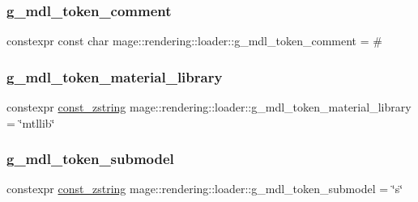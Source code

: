 \hypertarget{namespacemage_1_1rendering_1_1loader_accd79e03f94cc56cddd761a16d7d054e}{}\label{namespacemage_1_1rendering_1_1loader_accd79e03f94cc56cddd761a16d7d054e} 
\subsubsection{\texorpdfstring{g\+\_\+mdl\+\_\+token\+\_\+comment}{g\_mdl\_token\_comment}}
{\footnotesize\ttfamily constexpr const char mage\+::rendering\+::loader\+::g\+\_\+mdl\+\_\+token\+\_\+comment = \textquotesingle{}\#\textquotesingle{}}

\hypertarget{namespacemage_1_1rendering_1_1loader_ae399195268d14aceb61ebf3c020d0690}{}\label{namespacemage_1_1rendering_1_1loader_ae399195268d14aceb61ebf3c020d0690} 
\subsubsection{\texorpdfstring{g\+\_\+mdl\+\_\+token\+\_\+material\+\_\+library}{g\_mdl\_token\_material\_library}}
{\footnotesize\ttfamily constexpr \hyperlink{namespacemage_abfd9206dc607ceb5d13ec68bf075a5c0}{const\+\_\+zstring} mage\+::rendering\+::loader\+::g\+\_\+mdl\+\_\+token\+\_\+material\+\_\+library = \char`\"{}mtllib\char`\"{}}

\hypertarget{namespacemage_1_1rendering_1_1loader_a007345d2fdd9db8cedb0a50ff2bface7}{}\label{namespacemage_1_1rendering_1_1loader_a007345d2fdd9db8cedb0a50ff2bface7} 
\subsubsection{\texorpdfstring{g\+\_\+mdl\+\_\+token\+\_\+submodel}{g\_mdl\_token\_submodel}}
{\footnotesize\ttfamily constexpr \hyperlink{namespacemage_abfd9206dc607ceb5d13ec68bf075a5c0}{const\+\_\+zstring} mage\+::rendering\+::loader\+::g\+\_\+mdl\+\_\+token\+\_\+submodel = \char`\"{}s\char`\"{}}

